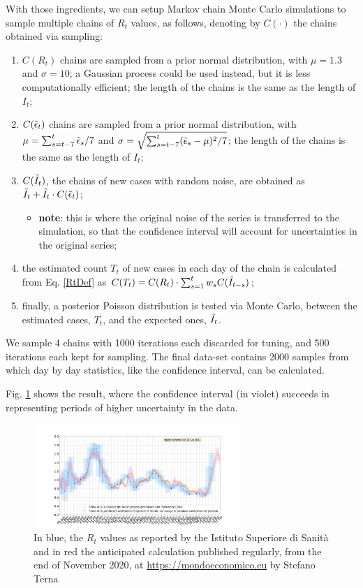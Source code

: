 \documentclass[graybox]{svmult}
\begin{document}
With those ingredients, we can setup Markov chain Monte Carlo simulations to sample multiple chains of $R_t$ values, as follows, denoting by $C(\cdot)$ the chains obtained via sampling:
\begin{enumerate}
    \item $C(R_t)$ chains are sampled from a prior normal distribution, with $\mu=1.3$ and $\sigma=10$; a Gaussian process could be used instead, but it is less computationally efficient; the length of the chains is the same as the length of $I_t$;
    \item $C(\Tilde{\epsilon}_t)$ chains are sampled from a prior normal distribution, with $\mu=\sum_{s=t-7}^t{\Tilde{\epsilon}_s}/7$ and $\sigma=\sqrt{\sum_{s=t-7}^{t}(\Tilde{\epsilon}_s-\mu)^2/7}$; the length of the chains is the same as the length of $I_t$;
    \item $C(\Tilde{I}_t)$, the chains of new cases with random noise, are obtained as $\Tilde{I}_t+\Tilde{I}_t \cdot C(\Tilde{\epsilon}_t)$;
    \begin{itemize}
        \item \textbf{note}: this is where the original noise of the series is transferred to the simulation, so that the confidence interval will account for uncertainties in the original series;
    \end{itemize}
    \item the estimated count $T_t$ of new cases in each day of the chain is calculated from Eq. \ref{RtDef} as $C(T_t) = C(R_t) \cdot \sum_{s=1}^t w_s C(\Tilde{I}_{t-s})$;
    \item finally, a posterior Poisson distribution is tested via Monte Carlo, between the estimated cases, $T_t$, and the expected ones, $\Tilde{I}_t$.
\end{enumerate}

We sample 4 chains with 1000 iterations each discarded for tuning, and 500 iterations each kept for sampling. The final data-set contains 2000 samples from which day by day statistics, like the confidence interval, can be calculated.

Fig. \ref{Rt} shows the result, where the confidence interval (in violet) succeeds in representing periods of higher uncertainty in the data.

\begin{figure}[t]
\center
\includegraphics[width=0.7\textwidth]{RtEstimation.jpg}
\caption{In blue, the $R_t$ values as reported by the Istituto Superiore di Sanit\`{a} and in red the anticipated calculation published regularly, from the end of November 2020, at \href{https://mondoeconomico.eu}{https://mondoeconomico.eu} by Stefano Terna}
\label{Rt}
\end{figure}
\end{document}
